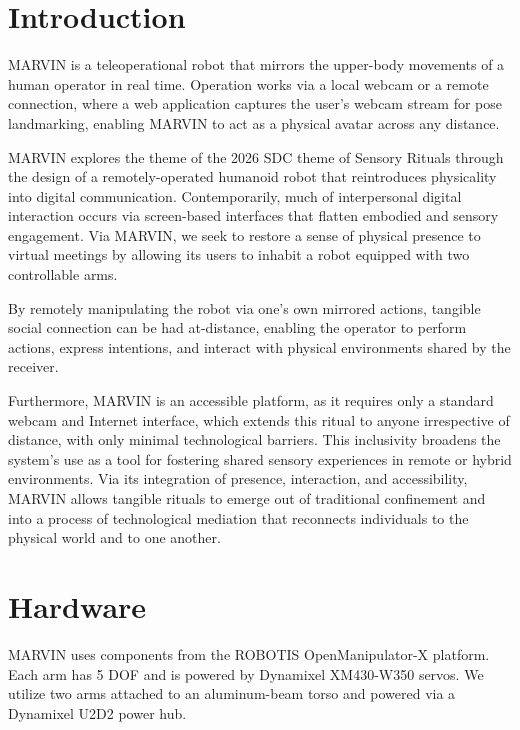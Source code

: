 \documentclass[manuscript,screen]{acmart} %
\begin{document}
\section{Introduction}
MARVIN is a teleoperational robot that mirrors the upper-body movements of a 
human operator in real time. Operation works via a local webcam or a remote 
connection, where a web application captures the user's webcam 
stream for pose landmarking, enabling MARVIN to act as a physical avatar across 
any distance.

MARVIN explores the theme of the 2026 SDC theme of Sensory Rituals through the 
design of a remotely-operated humanoid robot that reintroduces physicality 
into digital communication. 
Contemporarily, much of interpersonal digital interaction occurs via screen-based 
interfaces that flatten embodied and sensory engagement. Via MARVIN, we seek to
restore a sense of physical presence to virtual meetings by allowing its users to
inhabit a robot equipped with two controllable arms.

By remotely manipulating the robot via one's own mirrored actions, tangible social 
connection can be had at-distance, enabling the operator to perform actions, express
intentions, and interact with physical environments shared by the receiver.

Furthermore, MARVIN is an accessible platform, as it requires only a standard 
webcam and Internet interface, which extends this ritual to anyone irrespective 
of distance, with only minimal technological barriers. This inclusivity broadens 
the system's use as a tool for fostering shared sensory experiences in remote or 
hybrid environments. Via its integration of presence, interaction, and accessibility, 
MARVIN allows tangible rituals to emerge out of traditional confinement and into 
a process of technological mediation that reconnects individuals to the physical world
and to one another.


\section{Hardware}
MARVIN uses components from the ROBOTIS OpenManipulator-X platform. Each arm has 
5 DOF and is powered by Dynamixel XM430-W350 servos. We utilize two arms attached 
to an aluminum-beam torso and powered via a Dynamixel U2D2 power hub.
\end{document}
